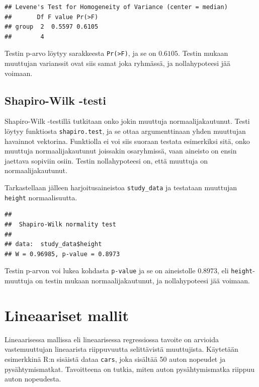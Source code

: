 \documentclass[
]{book}
\newenvironment{Shaded}{\begin{snugshade}}{\end{snugshade}}
\newcommand{\FunctionTok}[1]{\textcolor[rgb]{0.00,0.00,0.00}{#1}}
\newcommand{\NormalTok}[1]{#1}
\newcommand{\SpecialCharTok}[1]{\textcolor[rgb]{0.00,0.00,0.00}{#1}}
\begin{document}
\begin{verbatim}
## Levene's Test for Homogeneity of Variance (center = median)
##       Df F value Pr(>F)
## group  2  0.5597 0.6105
##        4
\end{verbatim}

Testin p-arvo löytyy sarakkeesta \texttt{Pr(\textgreater{}F)}, ja se on \(0.6105\). Testin mukaan muuttujan varianssit ovat siis samat joka ryhmässä, ja nollahypoteesi jää voimaan.

\hypertarget{shapiro}{%
\section{Shapiro-Wilk -testi}\label{shapiro}}

Shapiro-Wilk -testillä tutkitaan onko jokin muuttuja normaalijakautunut. Testi löytyy funktiosta \texttt{shapiro.test}, ja se ottaa argumenttinaan yhden muuttujan havainnot vektorina. Funktiolla ei voi siis suoraan testata esimerkiksi sitä, onko muuttuja normaalijakautunut joissakin osaryhmissä, vaan aineisto on ensin jaettava sopiviin osiin. Testin nollahypoteesi on, että muuttuja on normaalijakautunut.

Tarkastellaan jälleen harjoitusaineistoa \texttt{study\_data} ja testataan muuttujan \texttt{height} normaalisuutta.

\begin{Shaded}
\end{Shaded}

\begin{verbatim}
## 
##  Shapiro-Wilk normality test
## 
## data:  study_data$height
## W = 0.96985, p-value = 0.8973
\end{verbatim}

Testin p-arvon voi lukea kohdasta \texttt{p-value} ja se on aineistolle \(0.8973\), eli \texttt{height}-muuttuja on testin mukaan normaalijakautunut, ja nollahypoteesi jää voimaan.

\hypertarget{linear_models}{%
\chapter{Lineaariset mallit}\label{linear_models}}

Lineaarisessa mallissa eli lineaarisessa regressiossa tavoite on arvioida vastemuuttujan lineaarista riippuvuutta selittävistä muuttujista. Käytetään esimerkkinä R:n sisäistä dataa \texttt{cars}, joka sisältää 50 auton nopeudet ja pysähtymismatkat. Tavoitteena on tutkia, miten auton pysähtymismatka riippuu auton nopeudesta.
\end{document}
